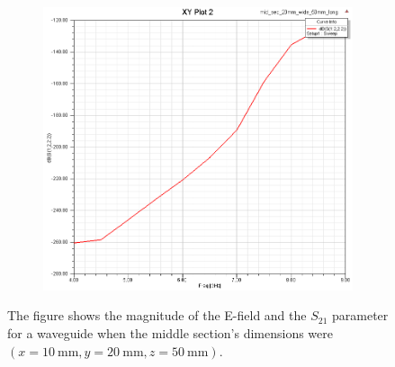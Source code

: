 \documentclass[12pt,a4paper]{article}
\begin{document}
\begin{figure}
\begin{subfigure}[b]{0.49\textwidth}
    \label{fig:2_2050_9ghz}
  \end{subfigure}
  \begin{subfigure}[b]{0.49\textwidth}
    \includegraphics[width=\textwidth]{./mid_sec_20mm_wide_50mm_long/s1222.png}
    \label{fig:2_2050_s1222}
  \end{subfigure}
  \caption{The figure shows the magnitude of the E-field and the $S_{21}$ parameter for a waveguide when the middle section's dimensions were $(x=\SI{10}{\milli\metre}, y=\SI{20}{\milli\metre}, z=\SI{50}{\milli\metre})$.}
  \label{fig:task2_2050}
\end{figure}
\end{document}
